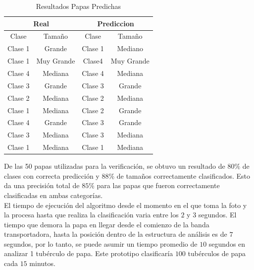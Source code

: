 	\begin{table}[ht]
		\centering
		\begin{tabular}{|cc|cc|}
			\hline
			\multicolumn{2}{|c|}{Real}                 & \multicolumn{2}{c|}{Prediccion}           \\ \hline
			\multicolumn{1}{|c|}{Clase}   & Tamaño     & \multicolumn{1}{c|}{Clase}   & Tamaño     \\ \hline
			\multicolumn{1}{|c|}{Clase 1} & Grande     & \multicolumn{1}{c|}{Clase 1} & Mediano    \\ \hline
			\multicolumn{1}{|c|}{Clase 1} & Muy Grande & \multicolumn{1}{c|}{Clase4}  & Muy Grande \\ \hline
			\multicolumn{1}{|c|}{Clase 4} & Mediana    & \multicolumn{1}{c|}{Clase 4} & Mediana    \\ \hline
			\multicolumn{1}{|c|}{Clase 3} & Grande     & \multicolumn{1}{c|}{Clase 3} & Grande     \\ \hline
			\multicolumn{1}{|c|}{Clase 2} & Mediana    & \multicolumn{1}{c|}{Clase 2} & Mediana    \\ \hline
			\multicolumn{1}{|c|}{Clase 1} & Mediana    & \multicolumn{1}{c|}{Clase 2} & Grande     \\ \hline
			\multicolumn{1}{|c|}{Clase 4} & Grande     & \multicolumn{1}{c|}{Clase 3} & Grande     \\ \hline
			\multicolumn{1}{|c|}{Clase 3} & Mediana    & \multicolumn{1}{c|}{Clase 3} & Mediana    \\ \hline
			\multicolumn{1}{|c|}{Clase 1} & Mediana    & \multicolumn{1}{c|}{Clase 1} & Mediana    \\ \hline
		\end{tabular}
		\caption{Resultados Papas Predichas}
		\label{table:res}
	\end{table}
	
	
	De las 50 papas utilizadas para la verificación, se obtuvo un resultado de $80\%$ de clases con correcta predicción y $88\%$ de tamaños correctamente clasificados. Esto da una precisión total de $85\%$ para las papas que fueron correctamente clasificadas en ambas categorías.\\
	
	El tiempo de ejecución del algoritmo desde el momento en el que toma la foto y la procesa hasta que realiza la clasificación varia entre los $2$ y $3$ segundos. El tiempo que demora la papa en llegar desde el comienzo de la banda transportadora, hasta la posición dentro de la estructura de análisis es de $7$ segundos, por lo tanto, se puede asumir un tiempo promedio de $10$ segundos en analizar 1 tubérculo de papa. Este prototipo clasificaría $100$ tubérculos de papa cada $15$ minutos.	 	

